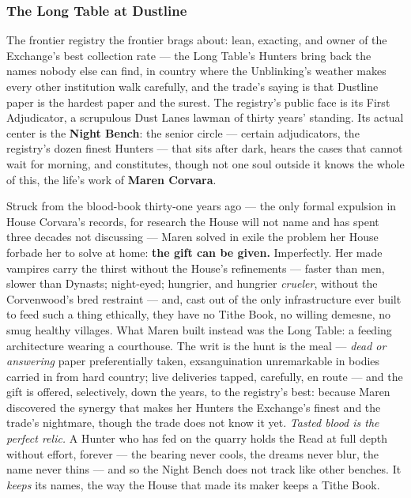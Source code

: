 \subsubsection{The Long Table at Dustline}

The frontier registry the frontier brags about: lean, exacting, and owner of the Exchange's best collection rate --- the Long Table's Hunters bring back the names nobody else can find, in country where the Unblinking's weather makes every other institution walk carefully, and the trade's saying is that Dustline paper is the hardest paper and the surest. The registry's public face is its First Adjudicator, a scrupulous Dust Lanes lawman of thirty years' standing. Its actual center is the \textbf{Night Bench}: the senior circle --- certain adjudicators, the registry's dozen finest Hunters --- that sits after dark, hears the cases that cannot wait for morning, and constitutes, though not one soul outside it knows the whole of this, the life's work of \textbf{Maren Corvara}.

Struck from the blood-book thirty-one years ago --- the only formal expulsion in House Corvara's records, for research the House will not name and has spent three decades not discussing --- Maren solved in exile the problem her House forbade her to solve at home: \textbf{the gift can be given.} Imperfectly. Her made vampires carry the thirst without the House's refinements --- faster than men, slower than Dynasts; night-eyed; hungrier, and hungrier \textit{crueler}, without the Corvenwood's bred restraint --- and, cast out of the only infrastructure ever built to feed such a thing ethically, they have no Tithe Book, no willing demesne, no smug healthy villages. What Maren built instead was the Long Table: a feeding architecture wearing a courthouse. The writ is the hunt is the meal --- \textit{dead or answering} paper preferentially taken, exsanguination unremarkable in bodies carried in from hard country; live deliveries tapped, carefully, en route --- and the gift is offered, selectively, down the years, to the registry's best: because Maren discovered the synergy that makes her Hunters the Exchange's finest and the trade's nightmare, though the trade does not know it yet. \textit{Tasted blood is the perfect relic.} A Hunter who has fed on the quarry holds the Read at full depth without effort, forever --- the bearing never cools, the dreams never blur, the name never thins --- and so the Night Bench does not track like other benches. It \textit{keeps} its names, the way the House that made its maker keeps a Tithe Book.

